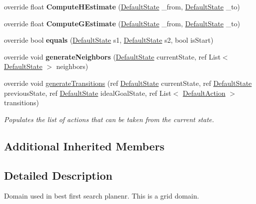 \begin{DoxyCompactItemize}
\item 
\hypertarget{class_best_first_domain_a1d06e92291ef344534786f356393785d}{override float {\bfseries Compute\-H\-Estimate} (\hyperlink{class_default_state}{Default\-State} \-\_\-from, \hyperlink{class_default_state}{Default\-State} \-\_\-to)}\label{class_best_first_domain_a1d06e92291ef344534786f356393785d}

\item 
\hypertarget{class_best_first_domain_aa9143172a03294ce3ac98364281a761b}{override float {\bfseries Compute\-G\-Estimate} (\hyperlink{class_default_state}{Default\-State} \-\_\-from, \hyperlink{class_default_state}{Default\-State} \-\_\-to)}\label{class_best_first_domain_aa9143172a03294ce3ac98364281a761b}

\item 
\hypertarget{class_best_first_domain_ab7c02a966dfcd1c947e57dd96b27b86c}{override bool {\bfseries equals} (\hyperlink{class_default_state}{Default\-State} s1, \hyperlink{class_default_state}{Default\-State} s2, bool is\-Start)}\label{class_best_first_domain_ab7c02a966dfcd1c947e57dd96b27b86c}

\item 
\hypertarget{class_best_first_domain_ae63dbb2ad18a754752ddc8914a9c7f06}{override void {\bfseries generate\-Neighbors} (\hyperlink{class_default_state}{Default\-State} current\-State, ref List$<$ \hyperlink{class_default_state}{Default\-State} $>$ neighbors)}\label{class_best_first_domain_ae63dbb2ad18a754752ddc8914a9c7f06}

\item 
override void \hyperlink{class_best_first_domain_a06d5fdd90348af45d2f2de4944eacd6f}{generate\-Transitions} (ref \hyperlink{class_default_state}{Default\-State} current\-State, ref \hyperlink{class_default_state}{Default\-State} previous\-State, ref \hyperlink{class_default_state}{Default\-State} ideal\-Goal\-State, ref List$<$ \hyperlink{class_default_action}{Default\-Action} $>$ transitions)
\begin{DoxyCompactList}\small\item\em Populates the list of actions that can be taken from the current state. \end{DoxyCompactList}\end{DoxyCompactItemize}
\subsection*{Additional Inherited Members}


\subsection{Detailed Description}
Domain used in best first search planenr. This is a grid domain. 

